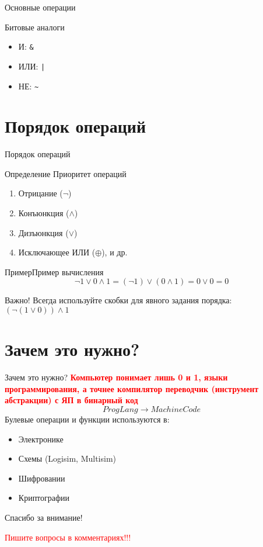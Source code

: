 \documentclass{beamer}
\newenvironment{rusdefinition}[1][Определение]{
    \begin{block}{#1}
}{\end{block}}
\newenvironment{rexample}[1][Пример]{\begin{exampleblock}{#1}}{\end{exampleblock}}
\begin{document}
\begin{frame}{Основные операции}
\begin{block}{Битовые аналоги}
\begin{itemize}
\item И: \texttt{\&}
\item ИЛИ: \texttt{|}
\item НЕ: \texttt{\~}
\end{itemize}
\end{block}
\end{frame}

\section{Порядок операций}
\begin{frame}{Порядок операций}
\begin{rusdefinition}{Приоритет операций}
\begin{enumerate}
\item Отрицание ($\neg$)
\item Конъюнкция ($\land$)
\item Дизъюнкция ($\lor$)
\item Исключающее ИЛИ ($\oplus$), и др.
\end{enumerate}
\end{rusdefinition}

\begin{rexample}{Пример вычисления}
\[
\neg 1 \lor 0 \land 1 = (\neg 1) \lor (0 \land 1) = 0 \lor 0 = 0
\]
\end{rexample}

\begin{alertblock}{Важно!}
Всегда используйте скобки для явного задания порядка:
$(\neg (1 \lor 0)) \land 1$
\end{alertblock}
\end{frame}
\section{Зачем это нужно?}
\begin{frame}{Зачем это нужно?}
    \textbf{\textcolor{red}{Компьютер понимает лишь 0 и 1, языки программирования, а точнее компилятор переводчик (инструмент абстракции) с ЯП в бинарный код}}
    \[ ProgLang \rightarrow MachineCode \]
    Булевые операции и функции используются в:
    \begin{itemize}
        \item Электронике
        \item Схемы (Logisim, Multisim)
        \item Шифровании 
        \item Криптографии
    \end{itemize}
\end{frame}
\begin{frame}{}
    \centering
    \Large Спасибо за внимание!
    
    \vspace{1cm}
    \small \textcolor{red}{Пишите вопросы в комментариях!!!}
\end{frame}
\end{document}

